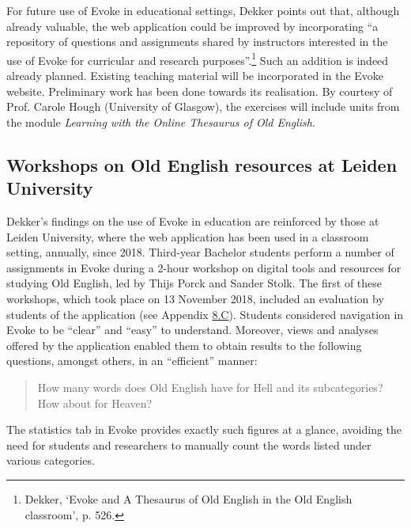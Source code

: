 For future use of Evoke in educational settings, Dekker points out that, although already valuable, the web application could be improved by incorporating ``a repository of questions and assignments shared by instructors interested in the use of Evoke for curricular and research purposes''.\footnote{Dekker, ‘Evoke and A Thesaurus of Old English in the Old English classroom’, p. 526.} Such an addition is indeed already planned. Existing teaching material will be incorporated in the Evoke website. Preliminary work has been done towards its realisation. By courtesy of Prof. Carole Hough (University of Glasgow), the exercises will include units from the module \textit{Learning with the Online Thesaurus of Old English}.%


\subsection{Workshops on Old English resources at Leiden University}

Dekker's findings on the use of Evoke in education are reinforced by those at Leiden University, where the web application has been used in a classroom setting, annually, since 2018. Third-year Bachelor students perform a number of assignments in Evoke during a 2-hour workshop on digital tools and resources for studying Old English, led by Thijs Porck and Sander Stolk. The first of these workshops, which took place on 13 November 2018, included an evaluation by students of the application (see Appendix \hyperref[Appendix8.C]{8.C}). Students considered navigation in Evoke to be ``clear'' and ``easy'' to understand. Moreover, views and analyses offered by the application enabled them to obtain results to the following questions, amongst others, in an ``efficient'' manner:
\begin{quote}
    How many words does Old English have for Hell and its subcategories? How about for Heaven?
\end{quote}
\noindent The statistics tab in Evoke provides exactly such figures at a glance, avoiding the need for students and researchers to manually count the words listed under various categories.

